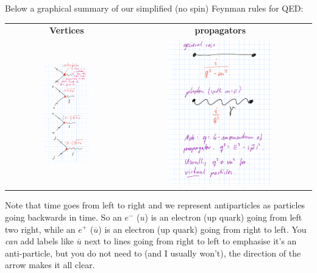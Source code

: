 Below a graphical summary of our simplified (no spin) Feynman rules for QED:\\
\begin{tabular}{cc}
\textbf{Vertices} & \textbf{propagators} \\
\includegraphics[width=0.4\textwidth]{fig/VertexFactorsQED}
&
\includegraphics[width=0.58\textwidth]{fig/FeynmanPropagators}
\end{tabular}
Note that time goes from left to right and we represent antiparticles as particles going backwards in time. So an $e^-$ ($u$) is an electron (up quark) going from left two right, while an $e^+$ ($\overline{u}$) is an electron (up quark) going from right to left. You \emph{can} add labels like $\overline{u}$ next to lines going from right to left to emphasise it's an anti-particle, but you do not need to (and I usually won't), the direction of the arrow makes it all clear.

